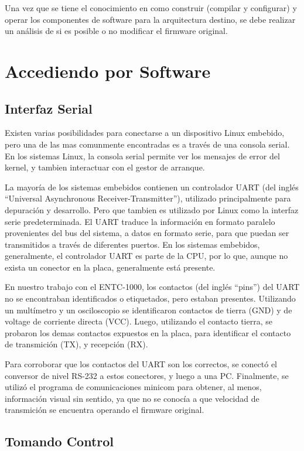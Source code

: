 \documentclass[conference]{IEEEtran}
\begin{document}
Una vez que se tiene el conocimiento en como construir (compilar y configurar)
y operar los componentes de software para la arquitectura destino, se
debe realizar un análisis de si es posible o no modificar el firmware original.


\section{Accediendo por Software}

\subsection{Interfaz Serial}

Existen varias posibilidades para conectarse a un dispositivo 
Linux embebido, pero una de las mas comunmente encontradas es
a través de una consola serial. En los sistemas Linux, la 
consola serial permite ver los mensajes de error del kernel,
y tambien interactuar con el gestor de arranque.

La mayoría de los sistemas embebidos contienen un controlador 
UART (del inglés ``Universal Asynchronous Receiver-Transmitter''),
utilizado principalmente para depuración y desarrollo.
Pero que tambien es utilizado por Linux como la interfaz serie
predeterminada.
El UART traduce la información en formato paralelo
provenientes del bus del sistema, a datos en formato serie,
para que puedan ser transmitidos a través de diferentes puertos.
En los sistemas embebidos, generalmente, el controlador UART es parte de la CPU,
por lo que, aunque no exista un conector en la placa, generalmente
está presente.

En nuestro trabajo con el ENTC-1000, los contactos (del inglés ``pins'') del UART
no se encontraban identificados o etiquetados, pero estaban presentes.
Utilizando un multímetro y un osciloscopio se identificaron contactos
de tierra (GND) y de voltage de corriente directa (VCC). Luego, utilizando
el contacto tierra, se probaron los demas contactos expuestos en la placa,
para identificar el contacto de transmición (TX), y recepción (RX).

Para corroborar que los contactos del UART son los correctos, se conectó
el conversor de nivel RS-232 a estos conectores, y luego a una PC.
Finalmente, se utilizó el programa de comunicaciones minicom para
obtener, al menos, información visual sin sentido, ya que
no se conocía a que velocidad de transmición se encuentra operando
el firmware original.

\subsection{Tomando Control}
\end{document}
